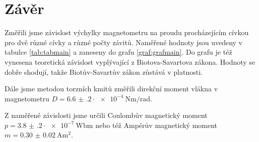 \section*{Závěr}
Změřili jsme závislost výchylky magnetometru na proudu procházejícím cívkou pro dvě různé cívky a různé počty závitů.
Naměřené hodnoty jsou uvedeny v tabulce \ref{tab:tabmain} a zaneseny do grafu \ref{graf:grafmain}.
Do grafu je též vynesena teoretická závislost vyplývající z Biotova-Savartova zákona.
Hodnoty se dobře shodují, takže Biotův-Savartův zákon zůstává v platnosti.

Dále jsme metodou torzních kmitů změřili direkční moment vlákna v magnetometru $D=\num{6.6(2)}\cdot \SI{e-4}{\newton\metre\per\radian}$.

Z naměřené závislosti jsme určili Coulombův magnetický moment $p = \num{3.8(2)} \cdot \SI{e-7}{\weber \meter}$ nebo též Ampérův magnetický moment $m = \SI{0.30(2)}{\ampere\metre\squared}$.
